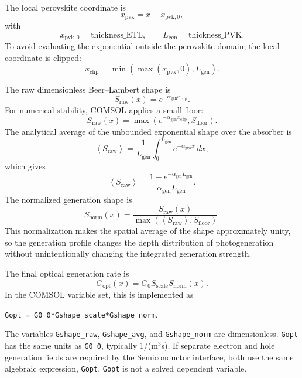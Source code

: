 The local perovskite coordinate is
\begin{equation}
x_{\mathrm{pvk}}=x-x_{\mathrm{pvk},0},
\end{equation}
with
\begin{equation}
x_{\mathrm{pvk},0}=\mathrm{thickness\_ETL},
\qquad
L_{\mathrm{gen}}=\mathrm{thickness\_PVK}.
\end{equation}
To avoid evaluating the exponential outside the perovskite domain, the local
coordinate is clipped:
\begin{equation}
x_{\mathrm{clip}}=
\min\left(\max\left(x_{\mathrm{pvk}},0\right),L_{\mathrm{gen}}\right).
\end{equation}

The raw dimensionless Beer--Lambert shape is
\begin{equation}
S_{\mathrm{raw}}(x)=e^{-\alpha_{\mathrm{gen}}x_{\mathrm{clip}}}.
\end{equation}
For numerical stability, COMSOL applies a small floor:
\begin{equation}
S_{\mathrm{raw}}(x)=
\max\left(e^{-\alpha_{\mathrm{gen}}x_{\mathrm{clip}}},
S_{\mathrm{floor}}\right).
\end{equation}
The analytical average of the unbounded exponential shape over the absorber is
\begin{equation}
\left\langle S_{\mathrm{raw}}\right\rangle =
\frac{1}{L_{\mathrm{gen}}}
\int_0^{L_{\mathrm{gen}}}e^{-\alpha_{\mathrm{gen}}x}\,dx,
\end{equation}
which gives
\begin{equation}
\left\langle S_{\mathrm{raw}}\right\rangle =
\frac{1-e^{-\alpha_{\mathrm{gen}}L_{\mathrm{gen}}}}
{\alpha_{\mathrm{gen}}L_{\mathrm{gen}}}.
\end{equation}
The normalized generation shape is
\begin{equation}
S_{\mathrm{norm}}(x)=
\frac{S_{\mathrm{raw}}(x)}
{\max\left(\left\langle S_{\mathrm{raw}}\right\rangle,
S_{\mathrm{floor}}\right)}.
\end{equation}
This normalization makes the spatial average of the shape approximately unity,
so the generation profile changes the depth distribution of photogeneration
without unintentionally changing the integrated generation strength.

The final optical generation rate is
\begin{equation}
G_{\mathrm{opt}}(x)=
G_0 S_{\mathrm{scale}}S_{\mathrm{norm}}(x).
\end{equation}
In the COMSOL variable set, this is implemented as
\begin{center}
\texttt{Gopt = G0\_0*Gshape\_scale*Gshape\_norm}.
\end{center}
The variables \texttt{Gshape\_raw}, \texttt{Gshape\_avg}, and \texttt{Gshape\_norm} are
dimensionless. \texttt{Gopt} has the same units as \texttt{G0\_0}, typically
1/(m$^3$s). If separate electron and hole generation fields are required by the
Semiconductor interface, both use the same algebraic expression,
\texttt{Gopt}. \texttt{Gopt} is not a solved dependent variable.

